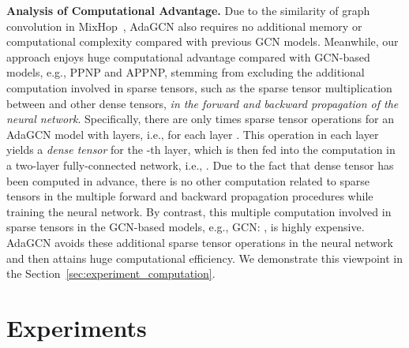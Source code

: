 \documentclass{article} \usepackage{iclr2021_conference,times}
\begin{document}
\textbf{Analysis of Computational Advantage.} Due to the similarity of graph convolution in MixHop~\citep{abu2019mixhop}, AdaGCN also requires no additional memory or computational complexity compared with previous GCN models. Meanwhile, our approach enjoys huge computational advantage compared with GCN-based models, e.g., PPNP and APPNP,  stemming from excluding the additional computation involved in sparse tensors, such as the sparse tensor multiplication between  and other dense tensors, \textit{in the forward and backward propagation of the neural network}. Specifically, there are only  times sparse tensor operations for an AdaGCN model with  layers, i.e.,  for each layer . This operation in each layer yields a \textit{dense tensor}  for the -th layer, which is then fed into the computation in a two-layer fully-connected network, i.e., . Due to the fact that dense tensor  has been computed in advance, there is no other computation related to sparse tensors in the multiple forward and backward propagation procedures while training the neural network. By contrast, this multiple computation involved in sparse tensors in the GCN-based models, e.g., GCN: , is highly expensive. AdaGCN avoids these additional sparse tensor operations in the neural network and then attains huge computational efficiency. We demonstrate this viewpoint in the Section~\ref{sec:experiment_computation}.

\section{Experiments}


\begin{table}[b!]
\label{table:dataset}
	\centering
	\caption{Dateset statistics}
\end{table}
\end{document}
